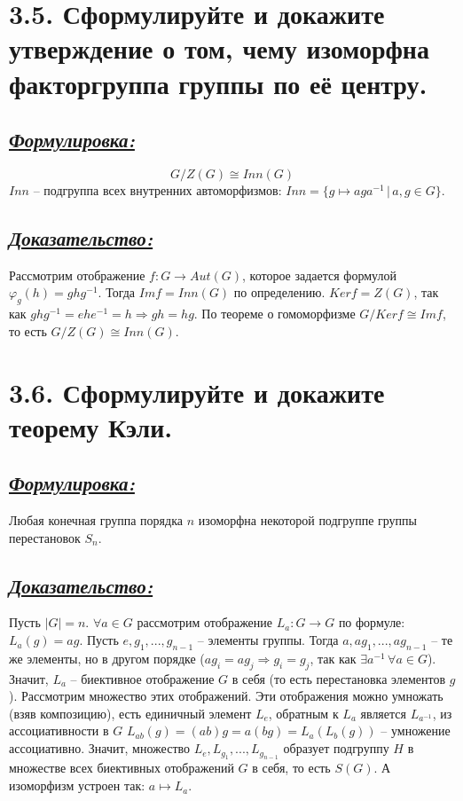 \documentclass{article}
\begin{document}
\section*{\LARGE 3.5. Сформулируйте и докажите утверждение о том, чему изоморфна факторгруппа группы по её центру. }
\subsection*{\Large \underline{\textit{Формулировка: }}}
$$G/Z(G) \cong Inn(G)$$
$Inn$ -- подгруппа всех внутренних автоморфизмов: $Inn = \{g \mapsto aga^{-1}\,|\, a,g \in G\}$.

\subsection*{\Large \underline{\textit{Доказательство:}}}
Рассмотрим отображение $f : G \rightarrow Aut(G)$, которое задается формулой 
\newline $\varphi_g(h) = ghg^{-1}$. Тогда $Imf = Inn(G)$ по определению. $Kerf = Z(G)$, так как $ghg^{-1} = ehe^{-1} = h \Rightarrow gh = hg$. По теореме о гомоморфизме $G / Kerf \cong Imf$, то есть $G / Z(G) \cong Inn(G)$. 

\section*{\LARGE 3.6. Сформулируйте и докажите теорему Кэли. }
\subsection*{\Large \underline{\textit{Формулировка: }}}
Любая конечная группа порядка $n$ изоморфна некоторой подгруппе группы перестановок $S_n$.

\subsection*{\Large \underline{\textit{Доказательство: }}}
Пусть $|G| = n$. $\forall a \in G$ рассмотрим отображение $L_a : G \rightarrow G$ по формуле: $L_a(g) = ag$.
\newline Пусть $e, g_1, ..., g_{n-1}$ -- элементы группы. Тогда $a, ag_1, ..., ag_{n - 1}$ -- те же элементы, но в другом порядке ($ag_i = ag_j \Rightarrow g_i = g_j$, так как $\exists a^{-1}\,\forall a \in G$). Значит, $L_a$ -- биективное отображение $G$ в себя (то есть перестановка элементов $g$). Рассмотрим множество этих отображений. Эти отображения можно умножать (взяв композицию), есть единичный элемент $L_e$, обратным к $L_a$ является $L_{a^{-1}}$, из ассоциативности в $G$ $L_{ab}(g) = (ab)g = a(bg) = L_a(L_b(g))$ -- умножение ассоциативно. Значит, множество $L_e, L_{g_1}, ..., L_{g_{n-1}}$ образует подгруппу $H$ в множестве всех биективных отображений $G$ в себя, то есть $S(G)$. А изоморфизм устроен так: $a \mapsto L_a$.
\end{document}
